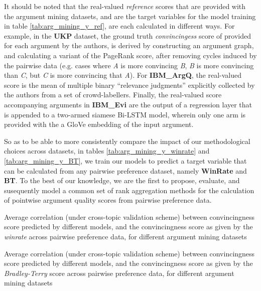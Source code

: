 \documentclass[notitlepage,12pt]{jedm}
\begin{document}
It should be noted that the real-valued \textit{reference} scores that are 
provided with the argument mining datasets, and are the target variables for 
the model training in table \ref{tab:arg_mining_y_ref}, are each 
calculated in different ways. 
For example, in the \textbf{UKP} dataset, the ground truth 
\textit{convincingess} score of provided for each argument by the authors, is 
derived by constructing an argument graph, and calculating a variant of the 
PageRank score, after removing cycles induced by the pairwise data (e.g. cases 
where \textit{A} is more convincing \textit{B}, \textit{B} is more convincing 
than \textit{C}, but \textit{C} is more convincing that \textit{A}).
For \textbf{IBM\_ArgQ}, the real-valued score is the mean of multiple binary 
``relevance judgments'' explicitly collected by the authors from a set of 
crowd-labellers.
Finally, the real-valued score accompanying arguments in \textbf{IBM\_Evi} are 
the output of a regression layer that is appended to a two-armed siamese 
Bi-LSTM model, wherein only one arm is provided with the a GloVe embedding of 
the input argument.

So as to be able to more consistently compare the impact of our methodological 
choices across datasets, in tables \ref{tab:arg_mining_y_winrate} and 
\ref{tab:arg_mining_y_BT}, we 
train our models to predict a target variable that can be calculated from any 
pairwise preference dataset, namely \textbf{WinRate} and \textbf{BT}.
To the best of our knowledge, we are the first to propose, evaluate, and 
susequently model a common set of rank aggregation methods for the calculation 
of pointwise argument quality scores from pairwise preference data.

\begin{table}
	\parbox{.45\linewidth}{
		\centering
		
	}
	\hfill
	\parbox{.45\linewidth}{
		\centering
		
	}
	\caption{
		Average correlation (under cross-topic validation scheme) between 
		convincingness score predicted by different models, and the 
		convincingness score as given by the \textit{winrate} across pairwise 
		preference data, for different argument mining datasets
	}
	\label{tab:arg_mining_y_winrate}
\end{table}


\begin{table}
	\parbox{.45\linewidth}{
		\centering
		
	}
	\hfill
	\parbox{.45\linewidth}{
		\centering
		
	}
	\caption{
		Average correlation (under cross-topic validation scheme) between 
		convincingness score predicted by different models, and the 
		convincingness score as given by the \textit{Bradley-Terry} score 
		across pairwise preference data, for different argument mining datasets
	}
	\label{tab:arg_mining_y_BT}
\end{table}
\end{document}
